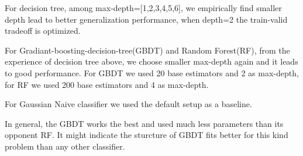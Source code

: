 \documentclass[runningheads]{llncs}
\begin{document}
For decision tree, among max-depth=[1,2,3,4,5,6], we empirically find smaller depth lead to better generalization performance, when depth=2 the train-valid tradeoff is optimized.

For Gradiant-boosting-decision-tree(GBDT) and Random Forest(RF), from the experience of decision tree above, we choose smaller max-depth again and it leads to good performance. For GBDT we used 20 base estimators and 2 as max-depth, for RF we used 200 base estimators and 4 as max-depth.

For Gaussian Naive classifier we used the default setup as a baseline.

In general, the GBDT works the best and used much less parameters than its opponent RF. It might indicate the sturcture of GBDT fits better for this kind problem than any other classifier.






\end{document}
